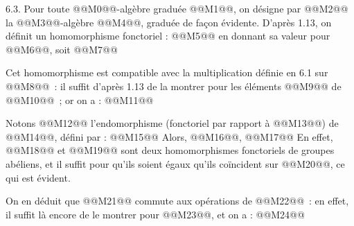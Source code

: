 
6.3.
Pour toute @@M0@@-algèbre graduée @@M1@@, on désigne par @@M2@@ la @@M3@@-algèbre @@M4@@, graduée de façon évidente. D'après 1.13, on définit un homomorphisme fonctoriel : @@M5@@ en donnant sa valeur pour @@M6@@, soit
@@M7@@

Cet homomorphisme est compatible avec la multiplication définie en 6.1 sur @@M8@@~: il suffit d'après 1.13 de la montrer pour les éléments @@M9@@ de @@M10@@~; or on a :
@@M11@@

Notons @@M12@@ l'endomorphisme (fonctoriel par rapport à @@M13@@) de @@M14@@, défini par :
@@M15@@
Alors, @@M16@@,
@@M17@@
En effet, @@M18@@ et @@M19@@ sont deux homomorphismes fonctoriels de groupes abéliens, et il suffit pour qu'ils soient égaux qu'ils coïncident sur @@M20@@, ce qui est évident.

On en déduit que @@M21@@ commute aux opérations de @@M22@@~: en effet, il suffit là encore de le montrer pour @@M23@@, et on a :
@@M24@@
